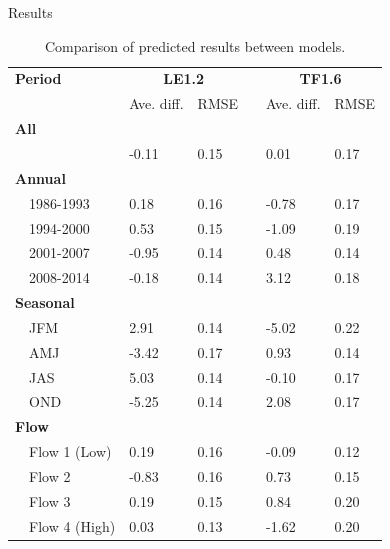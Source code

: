 \documentclass[serif]{beamer}\usepackage[]{graphicx}\usepackage[]{color}
\begin{document}
\begin{frame}{Results}
\scriptsize
\begin{table}[!tbp]
\caption{Comparison of predicted results between models.\label{tab:perfbtw}} 
\begin{center}
\begin{tabular}{lllcll}
\hline\hline
\multicolumn{1}{l}{\bfseries Period}&\multicolumn{2}{c}{\bfseries LE1.2}&\multicolumn{1}{c}{\bfseries }&\multicolumn{2}{c}{\bfseries TF1.6}\tabularnewline
\cline{2-3} \cline{5-6}
\multicolumn{1}{l}{}&\multicolumn{1}{c}{Ave. diff.}&\multicolumn{1}{c}{RMSE}&\multicolumn{1}{c}{}&\multicolumn{1}{c}{Ave. diff.}&\multicolumn{1}{c}{RMSE}\tabularnewline
\hline
{\bfseries All}&&&&&\tabularnewline
~~&-0.11&0.15&& 0.01&0.17\tabularnewline
\hline
{\bfseries Annual}&&&&&\tabularnewline
~~1986-1993& 0.18&0.16&&-0.78&0.17\tabularnewline
~~1994-2000& 0.53&0.15&&-1.09&0.19\tabularnewline
~~2001-2007&-0.95&0.14&& 0.48&0.14\tabularnewline
~~2008-2014&-0.18&0.14&& 3.12&0.18\tabularnewline
\hline
{\bfseries Seasonal}&&&&&\tabularnewline
~~JFM& 2.91&0.14&&-5.02&0.22\tabularnewline
~~AMJ&-3.42&0.17&& 0.93&0.14\tabularnewline
~~JAS& 5.03&0.14&&-0.10&0.17\tabularnewline
~~OND&-5.25&0.14&& 2.08&0.17\tabularnewline
\hline
{\bfseries Flow}&&&&&\tabularnewline
~~Flow 1 (Low)& 0.19&0.16&&-0.09&0.12\tabularnewline
~~Flow 2&-0.83&0.16&& 0.73&0.15\tabularnewline
~~Flow 3& 0.19&0.15&& 0.84&0.20\tabularnewline
~~Flow 4 (High)& 0.03&0.13&&-1.62&0.20\tabularnewline
\hline
\end{tabular}\end{center}

\end{table}

\end{frame}
\end{document}
